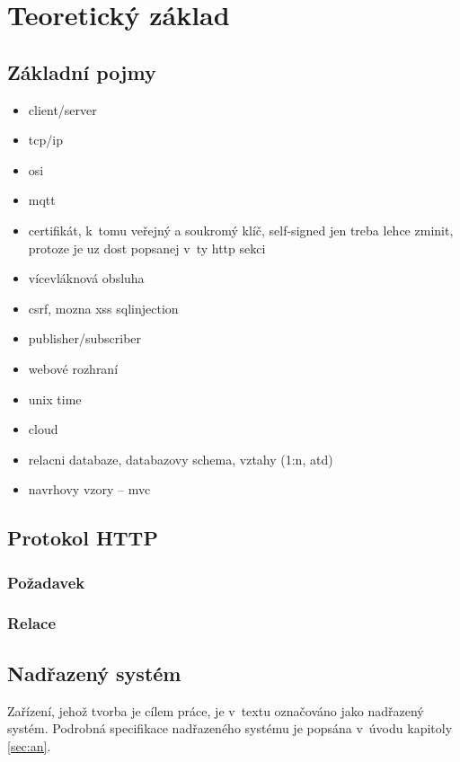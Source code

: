 \chapter{Teoretický základ}
\label{sec:te}

\section{Základní pojmy}

\begin{itemize}
    \item client/server
    \item tcp/ip
    \item osi
    \item mqtt
    \item certifikát, k~tomu veřejný a soukromý klíč, self-signed jen treba lehce zminit, protoze je uz dost popsanej v~ty http sekci
    \item vícevláknová obsluha
    \item csrf, mozna xss sqlinjection
    \item publisher/subscriber
    \item webové rozhraní
    \item unix time
    \item cloud
    \item relacni databaze, databazovy schema, vztahy (1:n, atd)
    \item navrhovy vzory -- mvc
\end{itemize}

\section{Protokol HTTP}

\subsection{Požadavek}

\subsection{Relace}

\section{Nadřazený systém}

Zařízení, jehož tvorba je cílem práce, je v~textu označováno jako nadřazený systém. Podrobná specifikace nadřazeného systému je popsána v~úvodu kapitoly \ref{sec:an}.

